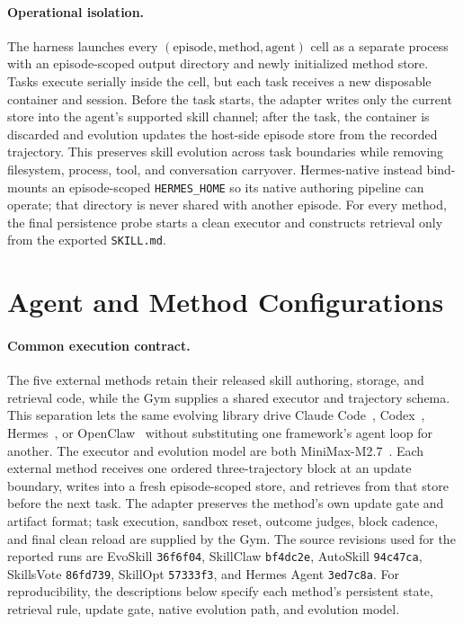 \documentclass{article}
\begin{document}
\paragraph{Operational isolation.}
The harness launches every $(\text{episode},\text{method},\text{agent})$ cell as
a separate process with an episode-scoped output directory and newly initialized
method store. Tasks execute serially inside the cell, but each task receives a
new disposable container and session. Before the task starts, the adapter writes
only the current store into the agent's supported skill channel; after the task,
the container is discarded and evolution updates the host-side episode store
from the recorded trajectory. This preserves skill evolution across task
boundaries while removing filesystem, process, tool, and conversation carryover.
Hermes-native instead bind-mounts an episode-scoped \texttt{HERMES\_HOME} so its
native authoring pipeline can operate; that directory is never shared with
another episode. For every method, the final persistence probe starts a clean
executor and constructs retrieval only from the exported \texttt{SKILL.md}.

\section{Agent and Method Configurations}
\label{app:configurations}
\label{app:method-details}

\paragraph{Common execution contract.}
The five external methods retain their released skill authoring, storage, and
retrieval code, while the Gym supplies a shared executor and trajectory schema.
This separation lets the same evolving library drive Claude
Code~\citep{anthropic2025claudecode}, Codex~\citep{openai2025codexcli},
Hermes~\citep{nousresearch2026hermesagent}, or
OpenClaw~\citep{openclaw2026openclaw} without substituting one framework's agent
loop for another. The executor and evolution model are both
MiniMax-M2.7~\citep{minimax2026m25}. Each external method receives
one ordered three-trajectory block at an update boundary, writes into a fresh
episode-scoped store, and retrieves from that store before the next task. The
adapter preserves the method's own update gate and artifact format; task execution,
sandbox reset, outcome judges, block cadence, and final clean reload are supplied
by the Gym. The source revisions used for the reported runs are EvoSkill
\texttt{36f6f04}, SkillClaw \texttt{bf4dc2e}, AutoSkill \texttt{94c47ca},
SkillsVote \texttt{86fd739}, SkillOpt \texttt{57333f3}, and Hermes Agent
\texttt{3ed7c8a}. For reproducibility, the descriptions below specify each
method's persistent state, retrieval rule, update gate, native evolution path,
and evolution model.
\end{document}
